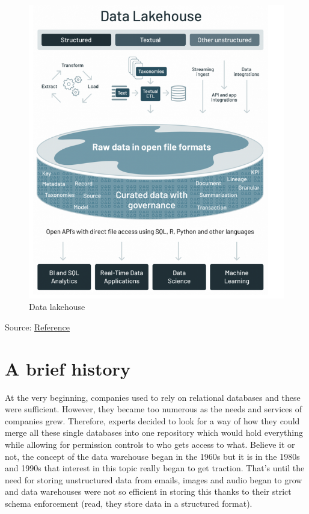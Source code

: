 \documentclass[
]{book}
\begin{document}
\begin{figure}
\centering
\includegraphics{./images/data_lakehouse.png}
\caption{Data lakehouse}
\end{figure}

Source: \href{https://www.databricks.com/blog/2021/05/19/evolution-to-the-data-lakehouse.html}{Reference}

\hypertarget{a-brief-history}{%
\section{A brief history}\label{a-brief-history}}

At the very beginning, companies used to rely on relational databases and these were sufficient. However, they became too numerous as the needs and services of companies grew. Therefore, experts decided to look for a way of how they could merge all these single databases into one repository which would hold everything while allowing for permission controls to who gets access to what. Believe it or not, the concept of the data warehouse began in the 1960s but it is in the 1980s and 1990s that interest in this topic really began to get traction. That's until the need for storing unstructured data from emails, images and audio began to grow and data warehouses were not so efficient in storing this thanks to their strict schema enforcement (read, they store data in a structured format).
\end{document}
